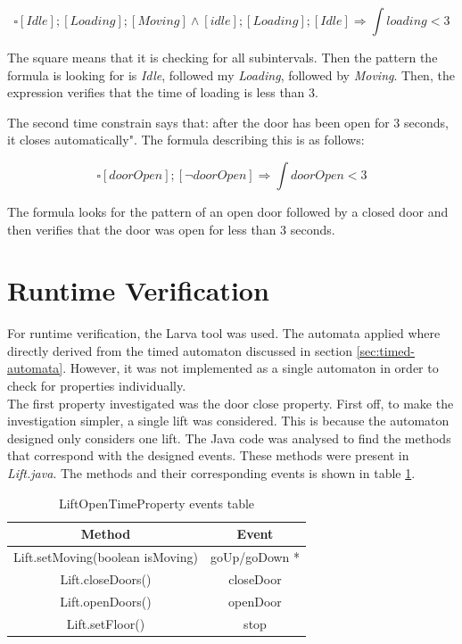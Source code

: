 \documentclass[a4paper, 12pt]{article}
\begin{document}
$$\square [Idle] ; [Loading] ;  [Moving]  \wedge [idle] ; [Loading] ; [Idle] \Rightarrow \int loading < 3$$

The square means that it is checking for all subintervals. Then the pattern the formula is looking for is \textit{Idle}, followed my \textit{Loading}, followed by \textit{Moving}. Then, the expression verifies that the time of loading is less than 3.

The second time constrain says that: after the door has been open for 3 seconds, it closes automatically". The formula describing this is as follows:

$$\square [doorOpen] ; [\neg doorOpen] \Rightarrow \int doorOpen < 3$$

The formula looks for the pattern of an open door followed by a closed door and then verifies that the door was open for less than 3 seconds. 

\section{Runtime Verification}

For runtime verification, the Larva tool was used. The automata applied where directly derived from the timed automaton discussed in section \ref{sec:timed-automata}. However, it was not implemented as a single automaton in order to check for properties individually. \\

The first property investigated was the door close property. First off, to make the investigation simpler, a single lift was considered. This is because the automaton designed only considers one lift. The Java code was analysed to find the methods that correspond with the designed events. These methods were present in \textit{Lift.java}. The methods and their corresponding events is shown in table \ref{tab:lift-open-time-property}.

\begin{table}[htbp]
   \centering
   \begin{tabular}{@{}  |c|c| @{}} %
      \toprule
      Method    & Event \\
      \midrule
      Lift.setMoving(boolean isMoving)   &  goUp/goDown *\\
      Lift.closeDoors()       & closeDoor  \\
      Lift.openDoors()       & openDoor  \\
      Lift.setFloor() & stop    \\
      \bottomrule
   \end{tabular}
   \caption{LiftOpenTimeProperty events table}
   \label{tab:lift-open-time-property}
\end{table}
\end{document}
